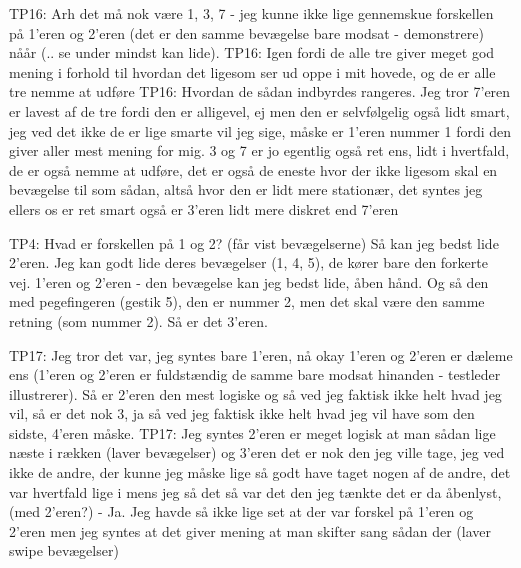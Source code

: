 TP16: Arh det må nok være 1, 3, 7 - jeg kunne ikke lige gennemskue forskellen på 1’eren og 2’eren (det er den samme bevægelse bare modsat - demonstrere) nåår (.. se under mindst kan lide). 
TP16: Igen fordi de alle tre giver meget god mening i forhold til hvordan det ligesom ser ud oppe i mit hovede, og de er alle tre nemme at udføre
TP16: Hvordan de sådan indbyrdes rangeres. Jeg tror 7’eren er lavest af de tre fordi den er alligevel, ej men den er selvfølgelig også lidt smart, jeg ved det ikke de er lige smarte vil jeg sige, måske er 1’eren nummer 1 fordi den giver aller mest mening for mig. 3 og 7 er jo egentlig også ret ens, lidt i hvertfald, de er også nemme at udføre, det er også de eneste hvor der ikke ligesom skal en bevægelse til som sådan, altså hvor den er lidt mere stationær, det syntes jeg ellers os er ret smart også er 3’eren lidt mere diskret end 7’eren












TP4: Hvad er forskellen på 1 og 2? (får vist bevægelserne) Så kan jeg bedst lide 2’eren. Jeg kan godt lide deres bevægelser (1, 4, 5), de kører bare den forkerte vej. 1’eren og 2’eren - den bevægelse kan jeg bedst lide, åben hånd. Og så den med pegefingeren (gestik 5), den er nummer 2, men det skal være den samme retning (som nummer 2). Så er det 3’eren. 


TP17: Jeg tror det var, jeg syntes bare 1’eren, nå okay 1’eren og 2’eren er dæleme ens (1’eren og 2’eren er fuldstændig de samme bare modsat hinanden - testleder illustrerer). Så er 2’eren den mest logiske og så ved jeg faktisk ikke helt hvad jeg vil, så er det nok 3, ja så ved jeg faktisk ikke helt hvad jeg vil have som den sidste, 4’eren måske.  
TP17: Jeg syntes 2’eren er meget logisk at man sådan lige næste i rækken (laver bevægelser) og 3’eren det er nok den jeg ville tage, jeg ved ikke de andre, der kunne jeg måske lige så godt have taget nogen af de andre, det var hvertfald lige i mens jeg så det så var det den jeg tænkte det er da åbenlyst, (med 2’eren?) - Ja. Jeg havde så ikke lige set at der var forskel på 1’eren og 2’eren men jeg syntes at det giver mening at man skifter sang sådan der (laver swipe bevægelser) 


